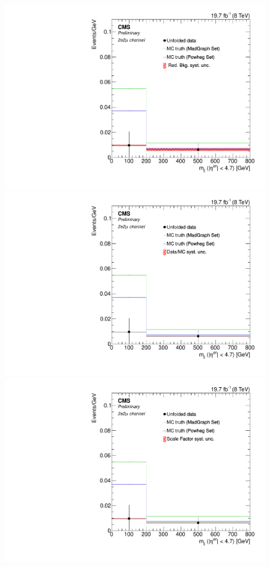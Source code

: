 \begin{figure}[hbtp]
\begin{center}
    \includegraphics[width=0.8\cmsFigWidth]{Figures/Unfolding/Systematics/ZZTo2e2m_Mjj_RedBkg_Mad_fr}     
    \includegraphics[width=0.8\cmsFigWidth]{Figures/Unfolding/Systematics/ZZTo2e2m_Mjj_UnfDataOverGenMC_Mad_fr}     
    \includegraphics[width=0.8\cmsFigWidth]{Figures/Unfolding/Systematics/ZZTo2e2m_Mjj_SFSq_Mad_fr}

\end{center}
\end{figure}
